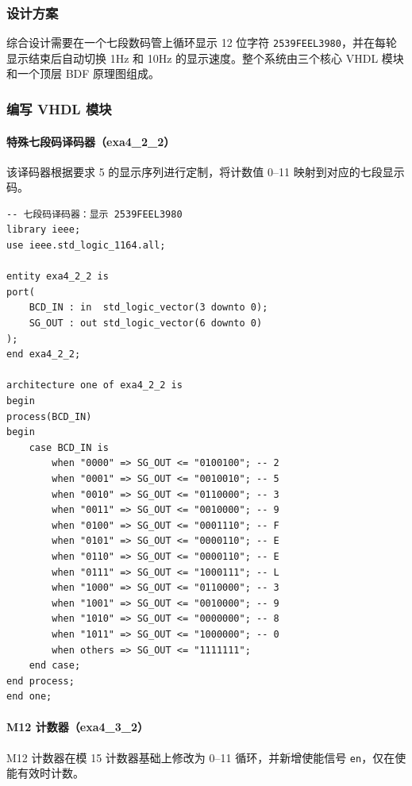 \documentclass[12pt]{ctexart}
\begin{document}
\subsubsection{设计方案}

综合设计需要在一个七段数码管上循环显示 12 位字符 \texttt{2539FEEL3980}，并在每轮显示结束后自动切换 1Hz 和 10Hz 的显示速度。整个系统由三个核心 VHDL 模块和一个顶层 BDF 原理图组成。

\subsubsection{编写 VHDL 模块}

\paragraph{特殊七段码译码器（exa4\_2\_2）}

该译码器根据要求 5 的显示序列进行定制，将计数值 0--11 映射到对应的七段显示码。

\begin{verbatim}
-- 七段码译码器：显示 2539FEEL3980
library ieee;
use ieee.std_logic_1164.all;

entity exa4_2_2 is
port(
    BCD_IN : in  std_logic_vector(3 downto 0);
    SG_OUT : out std_logic_vector(6 downto 0)
);
end exa4_2_2;

architecture one of exa4_2_2 is
begin
process(BCD_IN)
begin
    case BCD_IN is
        when "0000" => SG_OUT <= "0100100"; -- 2
        when "0001" => SG_OUT <= "0010010"; -- 5
        when "0010" => SG_OUT <= "0110000"; -- 3
        when "0011" => SG_OUT <= "0010000"; -- 9
        when "0100" => SG_OUT <= "0001110"; -- F
        when "0101" => SG_OUT <= "0000110"; -- E
        when "0110" => SG_OUT <= "0000110"; -- E
        when "0111" => SG_OUT <= "1000111"; -- L
        when "1000" => SG_OUT <= "0110000"; -- 3
        when "1001" => SG_OUT <= "0010000"; -- 9
        when "1010" => SG_OUT <= "0000000"; -- 8
        when "1011" => SG_OUT <= "1000000"; -- 0
        when others => SG_OUT <= "1111111";
    end case;
end process;
end one;
\end{verbatim}
\label{lst:decoder2}

\paragraph{M12 计数器（exa4\_3\_2）}

M12 计数器在模 15 计数器基础上修改为 0--11 循环，并新增使能信号 \texttt{en}，仅在使能有效时计数。
\end{document}
